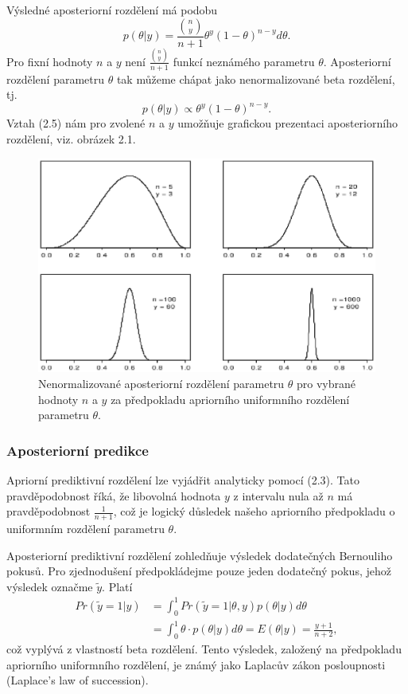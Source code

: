 Výsledné aposteriorní rozdělení má podobu
\begin{equation}
p(\theta | y) = \frac{{n \choose y}}{n + 1} \theta^y (1 - \theta) ^ {n - y} d\theta.
\end{equation}
Pro fixní hodnoty $n$ a $y$ není $\frac{{n \choose y}}{n + 1}$ funkcí neznámého parametru $\theta$. Aposteriorní rozdělení parametru $\theta$ tak můžeme chápat jako nenormalizované beta rozdělení, tj.
\begin{equation}
p(\theta | y) \varpropto \theta^y (1 - \theta)^{n - y}.
\end{equation}
Vztah (2.5) nám pro zvolené $n$ a $y$ umožňuje grafickou prezentaci aposteriorního rozdělení, viz. obrázek 2.1.
\begin{figure}[htp]
\centering
\includegraphics[scale = 0.65]{pictures/fig_2_1.eps}
\caption{Nenormalizované aposteriorní rozdělení parametru $\theta$ pro vybrané hodnoty $n$ a $y$ za předpokladu apriorního uniformního rozdělení parametru $\theta$.}
\label{fig_2_1}
\end{figure}

\subsubsection{Aposteriorní predikce}

Apriorní prediktivní rozdělení lze vyjádřit analyticky pomocí (2.3). Tato pravděpodobnost říká, že libovolná hodnota $y$ z intervalu nula až $n$ má pravděpodobnost $\frac{1}{n + 1}$, což je logický důsledek našeho apriorního předpokladu o uniformním rozdělení parametru $\theta$.

Aposteriorní prediktivní rozdělení zohledňuje výsledek dodatečných Bernouliho pokusů. Pro zjednodušení předpokládejme pouze jeden dodatečný pokus, jehož výsledek označme $\tilde{y}$. Platí
\begin{equation}
\begin{split}
Pr(\tilde{y} = 1 | y) & = \int_0^1 Pr(\tilde{y} = 1 | \theta, y)p(\theta|y)d\theta\\
 & = \int_0^1 \theta \cdot p(\theta | y) d\theta = E(\theta | y) = \frac{y + 1}{n + 2},
\end{split}
\end{equation}
což vyplývá z vlastností beta rozdělení. Tento výsledek, založený na předpokladu apriorního uniformního rozdělení, je známý jako Laplacův zákon posloupnosti (Laplace's law of succession).

